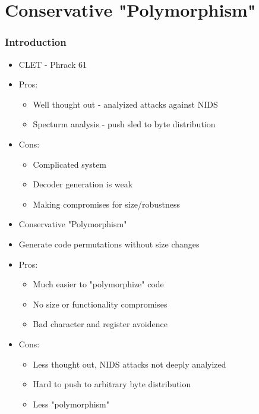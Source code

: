 \documentclass{beamer}
\newenvironment{sitemize}{\vspace{1mm}\begin{itemize}\itemsep 4pt\small}{\end{itemize}}
\begin{document}
\section{Conservative "Polymorphism"}

\begin{frame}[t]
  \frametitle{Introduction}
  \begin{sitemize}
    \item CLET - Phrack 61
    \pause
    \item Pros:
    \begin{sitemize}
      \item Well thought out - analyized attacks against NIDS
      \item Specturm analysis - push sled to byte distribution
    \end{sitemize}
    \pause
    \item Cons:
    \begin{sitemize}
      \item Complicated system
      \item Decoder generation is weak
      \item Making compromises for size/robustness
    \end{sitemize}
    \pause
    \item Conservative "Polymorphism"
    \item Generate code permutations without size changes
    \item Pros:
    \begin{sitemize}
      \item Much easier to "polymorphize" code
      \item No size or functionality compromises
      \item Bad character and register avoidence
    \end{sitemize}
    \item Cons:
    \begin{sitemize}
      \item Less thought out, NIDS attacks not deeply analyized
      \item Hard to push to arbitrary byte distribution
      \item Less "polymorphism"
    \end{sitemize}
  \end{sitemize}
\end{frame}
\end{document}
